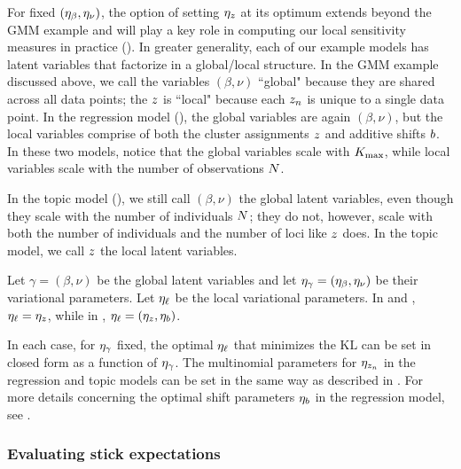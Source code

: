 For fixed $(\eta_{\beta}, \eta_{\nu})$, the option of setting $\eta_{z}$ at its optimum
extends beyond the GMM example and will play
a key role in computing our local sensitivity
measures in practice ().
In greater generality, each of our example models
has latent variables that factorize in a global/local structure.
In the GMM example discussed above, we call the variables $(\beta, \nu)$ ``global"
because they are shared across all data points; the $z$ is ``local"
because each $z_n$ is unique to a single data point.
In the regression model (),
the global variables are again $(\beta, \nu)$,
but the local variables comprise of both the cluster assignments $z$ and additive shifts $b$.
In these two models, notice that the global variables scale with ${K_{\mathrm{max}}}$, while
local variables scale with the number of observations $N$.

In the topic model (),
we still call $(\beta, \nu)$ the global latent variables, even though they scale
with the number of individuals $N$;
they do not, however, scale with both the number of individuals and the number of loci
like $z$ does. In the topic model, we call $z$ the local latent variables.

Let $\gamma = (\beta,\nu)$ be the global latent variables
and let $\eta_{\gamma} = (\eta_{\beta}, \eta_{\nu})$ be their variational parameters.
Let $\eta_{\ell}$ be the local variational parameters. In  and
, $\eta_{\ell} = \eta_{z}$, while
in , $\eta_{\ell} = (\eta_{z}, \eta_b)$.

In each case, for $\eta_{\gamma}$ fixed, the optimal $\eta_{\ell}$ that minimizes
the $\mathrm{KL}$ can be set in closed form as a function of $\eta_{\gamma}$.
The multinomial parameters for $\eta_{z_n}$ in the regression and topic models
can be set in the same way as described in .
For more details concerning the optimal shift parameters $\eta_b$
in the regression model, see .




\subsubsection{Evaluating stick expectations}

